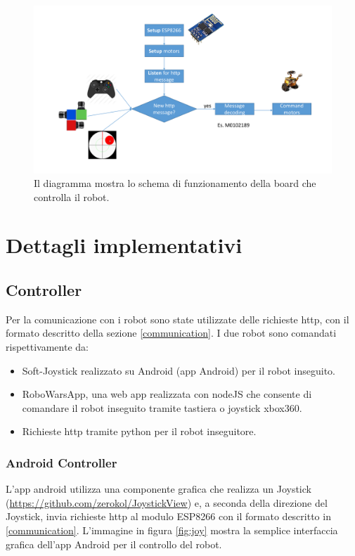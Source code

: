 \documentclass [11pt ,a4paper ,twoside ]{report}
\begin{document}
\begin{figure}
	\centering
		\hspace*{-4.9cm}\includegraphics[width=1.7\textwidth]{Images/img.pdf}
		\caption{Il diagramma mostra lo schema di funzionamento della board che controlla il robot.}
	\label{fig:img}
\end{figure}

\chapter{Dettagli implementativi}

\section{Controller}

Per la comunicazione con i robot sono state utilizzate delle richieste http, con il formato descritto della sezione \ref{communication}. I due robot sono comandati rispettivamente da:	
\begin{itemize}
\item Soft-Joystick realizzato su Android (app Android) per il robot inseguito.
\item RoboWarsApp, una web app realizzata con nodeJS che consente di comandare il robot inseguito tramite tastiera o joystick xbox360.
\item Richieste http tramite python per il robot inseguitore.
\end{itemize}

\subsection{Android Controller}
L'app android utilizza una componente grafica che realizza un Joystick (\url{https://github.com/zerokol/JoystickView}) e, a seconda della direzione del Joystick, invia richieste http al modulo ESP8266 con il formato descritto in \ref{communication}. L'immagine in figura \ref{fig:joy} mostra la semplice interfaccia grafica dell'app Android per il controllo del robot.
\end{document}
